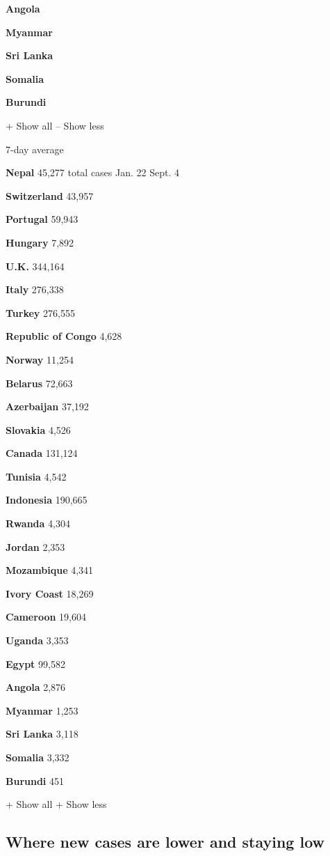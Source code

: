 \textbf{Angola}

\textbf{Myanmar}

\textbf{Sri Lanka}

\textbf{Somalia}

\textbf{Burundi}

+ Show all -- Show less

7-day average

\textbf{Nepal} 45,277 total cases Jan. 22 Sept. 4

\textbf{Switzerland} 43,957

\textbf{Portugal} 59,943

\textbf{Hungary} 7,892

\textbf{U.K.} 344,164

\textbf{Italy} 276,338

\textbf{Turkey} 276,555

\textbf{Republic of Congo} 4,628

\textbf{Norway} 11,254

\textbf{Belarus} 72,663

\textbf{Azerbaijan} 37,192

\textbf{Slovakia} 4,526

\textbf{Canada} 131,124

\textbf{Tunisia} 4,542

\textbf{Indonesia} 190,665

\textbf{Rwanda} 4,304

\textbf{Jordan} 2,353

\textbf{Mozambique} 4,341

\textbf{Ivory Coast} 18,269

\textbf{Cameroon} 19,604

\textbf{Uganda} 3,353

\textbf{Egypt} 99,582

\textbf{Angola} 2,876

\textbf{Myanmar} 1,253

\textbf{Sri Lanka} 3,118

\textbf{Somalia} 3,332

\textbf{Burundi} 451

+ Show all + Show less

\hypertarget{where-new-cases-are-lower-and-staying-low}{%
\subsection{Where new cases are lower and staying
low}\label{where-new-cases-are-lower-and-staying-low}}

